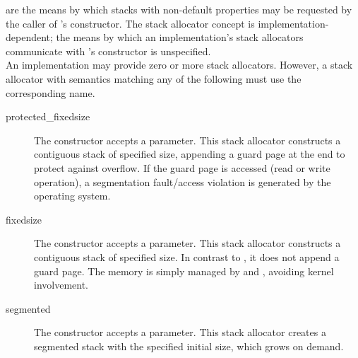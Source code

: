 %


\label{stackalloc}

are the means by which stacks with non-default properties may be requested by
the caller of \fiber's constructor. The stack allocator concept is
implementation-dependent; the means by which an implementation's
stack allocators communicate with \fiber's constructor is unspecified.\\

An implementation may provide zero or more stack allocators. However, a stack
allocator with semantics matching any of the following must use the
corresponding name.
\begin{description}
  \item[protected\_fixedsize] The constructor accepts a  parameter.
        This stack allocator constructs a contiguous stack of specified size,
        appending a guard page at the end to protect against overflow. If the
        guard page is accessed (read or write operation), a segmentation
        fault/access violation is generated by the operating system.
  \item[fixedsize] The constructor accepts a  parameter.
        This stack allocator constructs a contiguous stack of specified size.
        In contrast to , it does not append a guard
        page. The memory is simply managed by 
        and , avoiding kernel involvement.
  \item[segmented] The constructor accepts a  parameter.
        This stack allocator creates a segmented stack\cite{gccsplit} with the
        specified initial size, which grows on demand.
\end{description}
